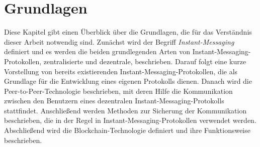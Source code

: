 \chapter{Grundlagen}
\label{chap:grundlagen}

Diese Kapitel gibt einen Überblick über die Grundlagen, die für das Verständnis dieser Arbeit notwendig sind. Zunächst wird der Begriff \textit{Instant-Messaging} definiert und es werden die beiden grundlegenden Arten von Instant-Messaging-Protokollen, zentralisierte und dezentrale, beschrieben. Darauf folgt eine kurze Vorstellung von bereits existierenden Instant-Messaging-Protokollen, die als Grundlage für die Entwicklung eines eigenen Protokolls dienen. Danach wird die Peer-to-Peer-Technologie beschrieben, mit deren Hilfe die Kommunikation zwischen den Benutzern eines dezentralen Instant-Messaging-Protokolls stattfindet. Anschließend werden Methoden zur Sicherung der Kommunikation  beschrieben, die in der Regel in Instant-Messaging-Protokollen verwendet werden. Abschließend wird die Blockchain-Technologie definiert und ihre Funktionsweise beschrieben.








